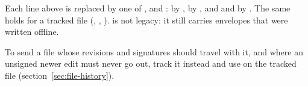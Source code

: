 \noindent Each line above is replaced by one of ,  and
:  by ,  by
, and  and  by . The same holds for a tracked file (, , ).  is not legacy: it still carries
envelopes that were written offline.

To send a file whose revisions and signatures should travel with it, and
where an unsigned newer edit must never go out, track it instead and use
 on the tracked file (section~\ref{sec:file-history}).
